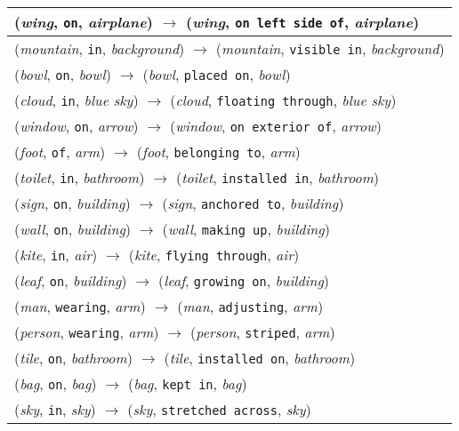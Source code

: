 \documentclass[runningheads]{llncs}
\begin{document}
{\begin{longtable}{ l }
(\textit{wing}, \texttt{on}, \textit{airplane}) $\rightarrow$ (\textit{wing}, \texttt{on left side of}, \textit{airplane}) \\ \hline
(\textit{mountain}, \texttt{in}, \textit{background}) $\rightarrow$ (\textit{mountain}, \texttt{visible in}, \textit{background}) \\ \hline
(\textit{bowl}, \texttt{on}, \textit{bowl}) $\rightarrow$ (\textit{bowl}, \texttt{placed on}, \textit{bowl}) \\ \hline
(\textit{cloud}, \texttt{in}, \textit{blue sky}) $\rightarrow$ (\textit{cloud}, \texttt{floating through}, \textit{blue sky}) \\ \hline
(\textit{window}, \texttt{on}, \textit{arrow}) $\rightarrow$ (\textit{window}, \texttt{on exterior of}, \textit{arrow}) \\ \hline
(\textit{foot}, \texttt{of}, \textit{arm}) $\rightarrow$ (\textit{foot}, \texttt{belonging to}, \textit{arm}) \\ \hline
(\textit{toilet}, \texttt{in}, \textit{bathroom}) $\rightarrow$ (\textit{toilet}, \texttt{installed in}, \textit{bathroom}) \\ \hline
(\textit{sign}, \texttt{on}, \textit{building}) $\rightarrow$ (\textit{sign}, \texttt{anchored to}, \textit{building}) \\ \hline
(\textit{wall}, \texttt{on}, \textit{building}) $\rightarrow$ (\textit{wall}, \texttt{making up}, \textit{building}) \\ \hline
(\textit{kite}, \texttt{in}, \textit{air}) $\rightarrow$ (\textit{kite}, \texttt{flying through}, \textit{air}) \\ \hline
(\textit{leaf}, \texttt{on}, \textit{building}) $\rightarrow$ (\textit{leaf}, \texttt{growing on}, \textit{building}) \\ \hline
(\textit{man}, \texttt{wearing}, \textit{arm}) $\rightarrow$ (\textit{man}, \texttt{adjusting}, \textit{arm}) \\ \hline
(\textit{person}, \texttt{wearing}, \textit{arm}) $\rightarrow$ (\textit{person}, \texttt{striped}, \textit{arm}) \\ \hline
(\textit{tile}, \texttt{on}, \textit{bathroom}) $\rightarrow$ (\textit{tile}, \texttt{installed on}, \textit{bathroom}) \\ \hline
(\textit{bag}, \texttt{on}, \textit{bag}) $\rightarrow$ (\textit{bag}, \texttt{kept in}, \textit{bag}) \\ \hline
(\textit{sky}, \texttt{in}, \textit{sky}) $\rightarrow$ (\textit{sky}, \texttt{stretched across}, \textit{sky}) \\ \hline

\end{longtable}}
\end{document}
